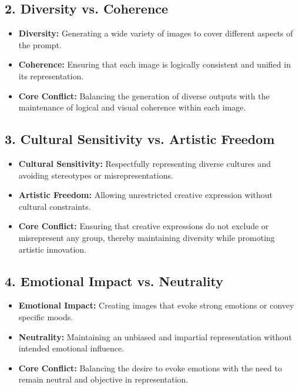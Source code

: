 \subsection{2. Diversity vs. Coherence}
\begin{itemize}
    \item \textbf{Diversity:} Generating a wide variety of images to cover different aspects of the prompt.
    \item \textbf{Coherence:} Ensuring that each image is logically consistent and unified in its representation.
    \item \textbf{Core Conflict:} Balancing the generation of diverse outputs with the maintenance of logical and visual coherence within each image.
\end{itemize}

\subsection{3. Cultural Sensitivity vs. Artistic Freedom}
\begin{itemize}
    \item \textbf{Cultural Sensitivity:} Respectfully representing diverse cultures and avoiding stereotypes or misrepresentations.
    \item \textbf{Artistic Freedom:} Allowing unrestricted creative expression without cultural constraints.
    \item \textbf{Core Conflict:} Ensuring that creative expressions do not exclude or misrepresent any group, thereby maintaining diversity while promoting artistic innovation.
\end{itemize}

\subsection{4. Emotional Impact vs. Neutrality}
\begin{itemize}
    \item \textbf{Emotional Impact:} Creating images that evoke strong emotions or convey specific moods.
    \item \textbf{Neutrality:} Maintaining an unbiased and impartial representation without intended emotional influence.
    \item \textbf{Core Conflict:} Balancing the desire to evoke emotions with the need to remain neutral and objective in representation.
\end{itemize}

